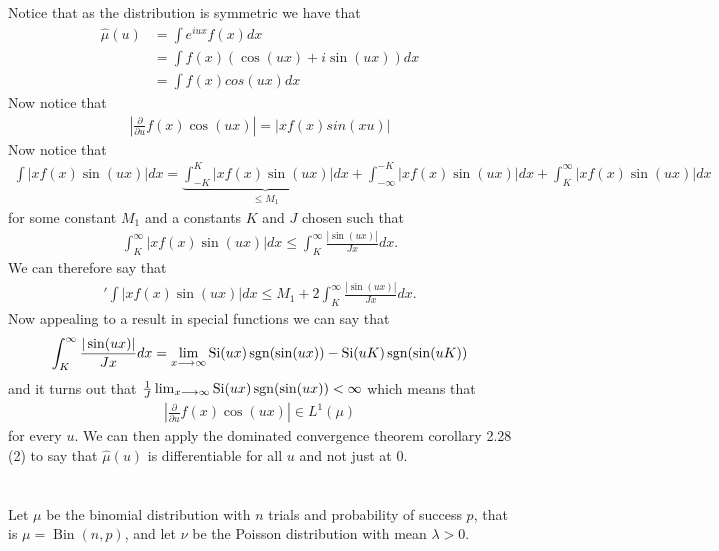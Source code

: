 \documentclass{unswmaths}
\begin{document}
\subsection{}
Notice that as the distribution is symmetric we have that
\begin{align}
	\hat{\mu}(u) &= \int e^{iux} f(x) dx \\
		 &= \int f(x)( \cos(ux) + i\sin(ux)) dx\\
		 &= \int f(x) cos(ux) dx
\end{align}
Now notice that
\begin{align}
	\left|\frac{\partial}{\partial u} f(x) \cos(ux)\right| = |xf(x)sin(xu)|
\end{align}
Now notice that
\begin{align}
	\int |xf(x)\sin(ux)| dx = \underbrace{\int_{-K}^{K} |xf(x)\sin(ux)| dx}_{\leq M_1} + \int_{-\infty}^{-K} |xf(x)\sin(ux)| dx +\int_{K}^{\infty} |xf(x)\sin(ux)| dx
\end{align}
for some constant $ M_1 $ and a constants $ K $ and $ J $ chosen such that
\begin{align}
	\int_{K}^\infty |xf(x)\sin(ux)| dx \leq \int_{K}^\infty \frac{|\sin(ux)|}{Jx} dx.
\end{align}
We can therefore say that
\begin{align}'
	\int |xf(x)\sin(ux)|dx \leq M_1 + 2 \int_K^\infty \frac{|\sin(ux)|}{Jx}dx.
\end{align}
Now appealing to a result in special functions we can say that 
\begin{align}
	\int_K^\infty \frac{|\sin(ux)|}{Jx}dx = \lim_{x \longrightarrow \infty} \operatorname{Si}(ux)\operatorname{sgn}(\sin(ux)) -\operatorname{Si}(uK)\operatorname{sgn}(\sin(uK))
\end{align}
and it turns out that $ \frac{1}{J}\lim_{x\longrightarrow\infty} \operatorname{Si}(ux)\operatorname{sgn}(\sin(ux)) < \infty $ which means that 
\begin{align}
	\left|\frac{\partial}{\partial u} f(x) \cos(ux)\right| \in L^1(\mu)
\end{align}
for every $ u $. 
We can then apply the dominated convergence theorem corollary 2.28 (2) to say that $ \hat{\mu}(u) $ is differentiable for all $ u $ and not just at $ 0 $.
\section{}
Let $\mu$ be the binomial distribution with $ n $ trials and probability of success $ p $, that is $ \mu = \operatorname{Bin}(n,p) $, and let $ \nu $ be the Poisson distribution with mean $ \lambda > 0 $. 
\end{document}
